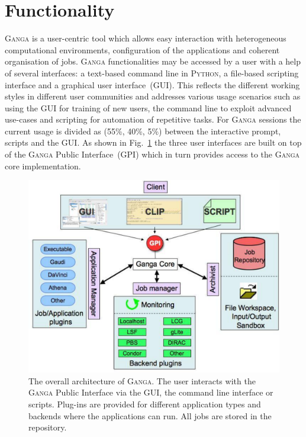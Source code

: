 \documentclass{elsart}
\def\ganga {\textsc{Ganga}\xspace}
\def\python {\textsc{Python}\xspace}
\def\GPI{GPI\xspace}
\begin{document}
\section{Functionality}
\label{sec:functionality}
\ganga is a user-centric tool which allows easy interaction with heterogeneous
computational environments, configuration of the applications and coherent
organisation of jobs. \ganga functionalities may be accessed by a user with a
help of several interfaces: a text-based command line in \python, a file-based
scripting interface and a graphical user interface~(GUI). This reflects the different
working styles in different user communities and addresses various usage
scenarios such as using the GUI for training of new users, the command line to
exploit advanced use-cases and scripting for automation of repetitive tasks.
For \ganga sessions the current usage is divided as (55\%, 40\%, 5\%) between
the interactive prompt, scripts and the GUI. As shown in
Fig.~\ref{fig:GPI_architecture} the three user interfaces are built on top of
the \ganga Public Interface~(\GPI) which in turn provides access to the \ganga
core implementation.
\begin{figure}[htbp]
  \centering
  \includegraphics[width=14cm]{GangaOverview.pdf}
  \caption{The overall architecture of \ganga. The user interacts with the
    \ganga Public Interface via the GUI, the command line interface or
    scripts. Plug-ins are provided for different application types and
    backends where the applications can run. All jobs are stored in the
    repository.}
  \label{fig:GPI_architecture}
\end{figure}
\end{document}

